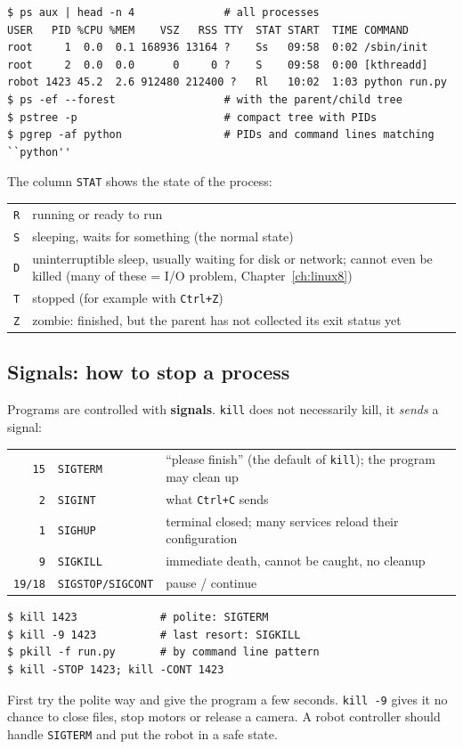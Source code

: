 \begin{verbatim}
$ ps aux | head -n 4              # all processes
USER   PID %CPU %MEM    VSZ   RSS TTY  STAT START  TIME COMMAND
root     1  0.0  0.1 168936 13164 ?    Ss   09:58  0:02 /sbin/init
root     2  0.0  0.0      0     0 ?    S    09:58  0:00 [kthreadd]
robot 1423 45.2  2.6 912480 212400 ?   Rl   10:02  1:03 python run.py
$ ps -ef --forest                 # with the parent/child tree
$ pstree -p                       # compact tree with PIDs
$ pgrep -af python                # PIDs and command lines matching ``python''
\end{verbatim}
The column \texttt{STAT} shows the state of the process:
\begin{center}
\renewcommand{\arraystretch}{1.15}
\begin{tabular}{cp{11cm}}
\texttt{R} & running or ready to run\\
\texttt{S} & sleeping, waits for something (the normal state)\\
\texttt{D} & uninterruptible sleep, usually waiting for disk or network; cannot even be killed (many of these = I/O problem, Chapter~\ref{ch:linux8})\\
\texttt{T} & stopped (for example with \texttt{Ctrl+Z})\\
\texttt{Z} & zombie: finished, but the parent has not collected its exit status yet\\
\end{tabular}
\end{center}

\subsection*{Signals: how to stop a process}
Programs are controlled with \textbf{signals}. \texttt{kill} does not necessarily kill, it \emph{sends} a signal:
\begin{center}
\renewcommand{\arraystretch}{1.15}
\begin{tabular}{rlp{9.0cm}}
\texttt{15} & \texttt{SIGTERM} & ``please finish'' (the default of \texttt{kill}); the program may clean up\\
\texttt{2} & \texttt{SIGINT} & what \texttt{Ctrl+C} sends\\
\texttt{1} & \texttt{SIGHUP} & terminal closed; many services reload their configuration\\
\texttt{9} & \texttt{SIGKILL} & immediate death, cannot be caught, no cleanup\\
\texttt{19/18} & \texttt{SIGSTOP/SIGCONT} & pause / continue\\
\end{tabular}
\end{center}
\begin{verbatim}
$ kill 1423             # polite: SIGTERM
$ kill -9 1423          # last resort: SIGKILL
$ pkill -f run.py       # by command line pattern
$ kill -STOP 1423; kill -CONT 1423
\end{verbatim}
First try the polite way and give the program a few seconds. \texttt{kill -9} gives it no chance to close files, stop motors or release a camera. A robot controller should handle \texttt{SIGTERM} and put the robot in a safe state.

